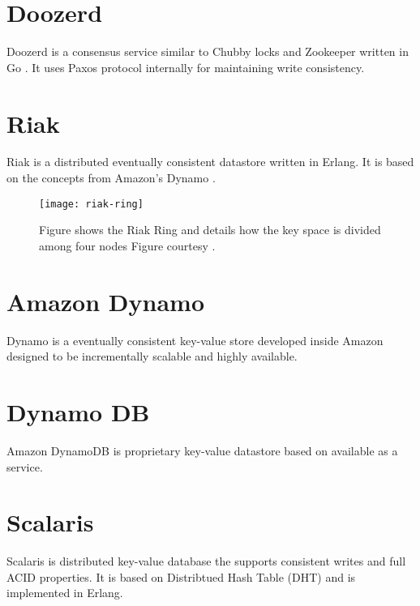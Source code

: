 \section{Doozerd}

Doozerd \citep{doozerd} is a consensus service similar to Chubby locks
 and Zookeeper  written in 
Go \citep{golang}. It uses Paxos protocol internally for maintaining
write consistency.

\section{Riak}

Riak \citep{riak} is a distributed eventually consistent datastore written in 
Erlang. It is based on the concepts from Amazon's Dynamo \citep{DeCandia07}.

\begin{figure}
  \texttt{[image: riak-ring]}
  \caption[Riak Ring]{%
    Figure shows the Riak Ring and details how the key space is divided among 
    four nodes
    Figure courtesy \citet{riak}.}
  \label{figure:megastore}
\end{figure}


\section{Amazon Dynamo}

Dynamo \citep{DeCandia07} is a eventually consistent key-value store developed 
inside Amazon designed to be incrementally scalable and highly available.

\section{Dynamo DB}

Amazon DynamoDB \citep{dynamoDB} is proprietary key-value datastore based on
\citet{DeCandia07} available as a service.

\section{Scalaris}

Scalaris \citep{scalaris} is distributed key-value database the supports
consistent writes and full ACID properties. It is based on Distribtued Hash
Table (DHT)%
and is implemented in Erlang.



